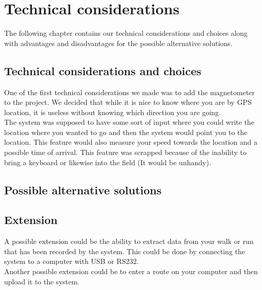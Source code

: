 \chapter{Technical considerations}
The following chapter contains our technical considerations and choices along with advantages and disadvantages for the possible alternative solutions. \\

\section{Technical considerations and choices}
One of the first technical considerations we made was to add the magnetometer to the project. We decided that while it is nice to know where you are by GPS location, it is useless without knowing which direction you are going.\\

The system was supposed to have some sort of input where you could write the location where you wanted to go and then the system would point you to the location. This feature would also measure your speed towards the location and a possible time of arrival. This feature was scrapped because of the inability to bring a keyboard or likewise into the field (It would be unhandy).\\


\section{Possible alternative solutions}



\section{Extension}
A possible extension could be the ability to extract data from your walk or run that has been recorded by the system. This could be done by connecting the system to a computer with USB or RS232. \\

Another possible extension could be to enter a route on your computer and then upload it to the system.\\

